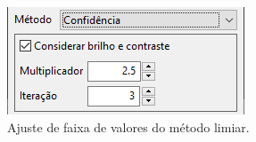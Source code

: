 \begin{itemize}
	\begin{figure}[!htb]
	\centering
	\includegraphics[scale=0.7]{../user_guide_figures/invesalius_screen/segmentation_region_growing_confidence_parameter_pt.png}
	\caption{Ajuste de faixa de valores do método limiar.}
	\label{fig:segmentation_region_growing_confidence_parameter}
	\end{figure}	
	
	
\end{itemize}

